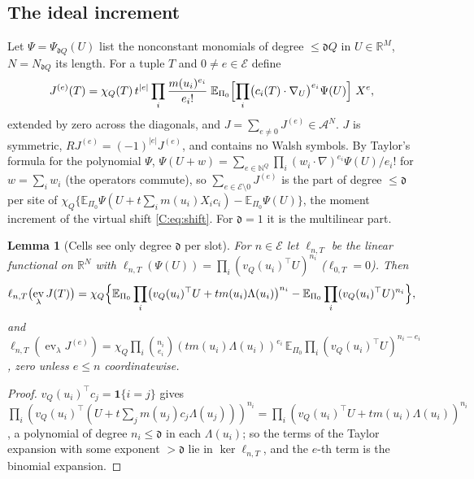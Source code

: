 \documentclass[11pt]{article}
\newtheorem{lemma}[lemma]{Lemma}
\DeclareMathOperator{\ev}{ev}
\newcommand{\E}{\mathbb{E}}
\newcommand{\R}{\mathbb{R}}
\newcommand{\cA}{\mathcal{A}}
\newcommand{\cE}{\mathcal{E}}
\newcommand{\abs}[1]{\lvert #1\rvert}
\newcommand{\one}{\mathbf{1}}
\newcommand{\dg}{\mathfrak{d}}
\begin{document}
\subsection{The ideal increment}
Let \(\Psi=\Psi_{\dg Q}(U)\) list the nonconstant monomials of degree
\(\le\dg Q\) in \(U\in\R^M\), \(N=N_{\dg Q}\) its length.  For a tuple
\(T\) and \(0\ne e\in\cE\) define
\begin{equation}
 J^{(e)}(T)=\chi_Q(T)\,t^{\abs e}\prod_i\frac{m(u_i)^{e_i}}{e_i!}\;
 \E_{\Pi_0}\Bigl[\prod_i\bigl(c_i(T)\cdot\nabla_U\bigr)^{e_i}\Psi(U)\Bigr]\ X^e,
 \label{C:eq:ideal}
\end{equation}
extended by zero across the diagonals, and \(J=\sum_{e\ne0}J^{(e)}\in\cA^N\).
\(J\) is symmetric, \(RJ^{(e)}=(-1)^{\abs e}J^{(e)}\), and contains no
Walsh symbols.  By Taylor's formula for the polynomial \(\Psi\),
\(\Psi(U+w)=\sum_{e\in\mathbb N^Q}\prod_i(w_i\cdot\nabla)^{e_i}\Psi(U)/e_i!\)
for \(w=\sum_iw_i\) (the operators commute), so
\(\sum_{e\in\cE\setminus0}J^{(e)}\) is the part of degree \(\le\dg\) per
site of \(\chi_Q\{\E_{\Pi_0}\Psi(U+t\sum_im(u_i)X_ic_i)-\E_{\Pi_0}\Psi(U)\}\),
the moment increment of the virtual shift \eqref{C:eq:shift}.  For \(\dg=1\)
it is the multilinear part.

\begin{lemma}[Cells see only degree \(\dg\) per slot]\label{C:lem:cells}
For \(n\in\cE\) let \(\ell_{n,T}\) be the linear functional on \(\R^N\)
with \(\ell_{n,T}(\Psi(U))=\prod_i(v_Q(u_i)^\top U)^{n_i}\) (\(\ell_{0,T}=0\)).
Then
\[
 \ell_{n,T}\bigl(\ev_\lambda J(T)\bigr)
 =\chi_Q\Bigl\{\E_{\Pi_0}\prod_i\bigl(v_Q(u_i)^\top U+tm(u_i)\Lambda(u_i)\bigr)^{n_i}
 -\E_{\Pi_0}\prod_i(v_Q(u_i)^\top U)^{n_i}\Bigr\},
\]
and \(\ell_{n,T}(\ev_\lambda J^{(e)})=\chi_Q\prod_i\binom{n_i}{e_i}(tm(u_i)\Lambda(u_i))^{e_i}
\,\E_{\Pi_0}\prod_i(v_Q(u_i)^\top U)^{n_i-e_i}\), zero unless \(e\le n\)
coordinatewise.
\end{lemma}
\begin{proof}
\(v_Q(u_i)^\top c_j=\one\{i=j\}\) gives
\(\prod_i(v_Q(u_i)^\top(U+t\sum_jm(u_j)c_j\Lambda(u_j)))^{n_i}
=\prod_i(v_Q(u_i)^\top U+tm(u_i)\Lambda(u_i))^{n_i}\), a polynomial of
degree \(n_i\le\dg\) in each \(\Lambda(u_i)\); so the terms of the Taylor
expansion with some exponent \(>\dg\) lie in \(\ker\ell_{n,T}\), and the
\(e\)-th term is the binomial expansion.
\end{proof}
\end{document}
